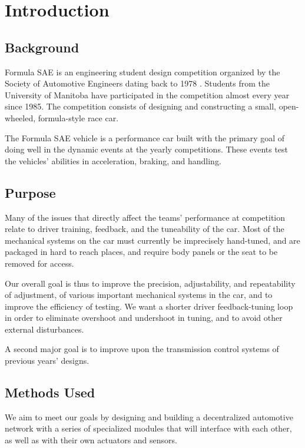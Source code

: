 %
%
%
%

\chapter{Introduction}

\section{Background}

Formula SAE is an engineering student design competition organized by the Society of Automotive Engineers dating back to 1978 \cite{fsaehistory}. Students from the University of Manitoba have participated in the competition almost every year since 1985. The competition consists of designing and constructing a small, open-wheeled, formula-style race car.

The Formula SAE vehicle is a performance car built with the primary goal of doing well in the dynamic events at the yearly competitions. These events test the vehicles' abilities in acceleration, braking, and handling.

\section{Purpose}

Many of the issues that directly affect the teams' performance at competition relate to driver training, feedback, and the tuneability of the car. Most of the mechanical systems on the car must currently be imprecisely hand-tuned, and are packaged in hard to reach places, and require body panels or the seat to be removed for access.

Our overall goal is thus to improve the precision, adjustability, and repeatability of adjustment, of various important mechanical systems in the car, and to improve the efficiency of testing. We want a shorter driver feedback-tuning loop in order to eliminate overshoot and undershoot in tuning, and to avoid other external disturbances.

A second major goal is to improve upon the transmission control systems of previous years' designs.


\section{Methods Used}

We aim to meet our goals by designing and building a decentralized automotive network with a series of specialized modules that will interface with each other, as well as with their own actuators and sensors.
